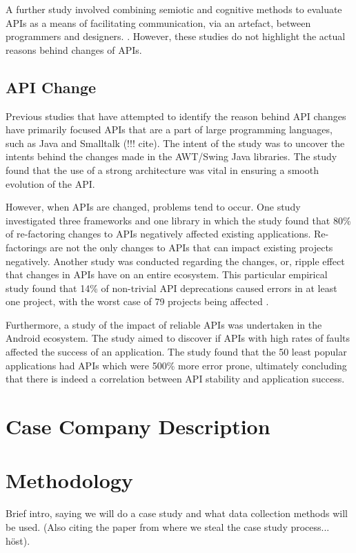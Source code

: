 \documentclass[10pt,twocolumn]{article}
\begin{document}
A further study involved combining semiotic and cognitive methods to evaluate APIs as a means of facilitating communication, via an artefact, between programmers and designers. \cite{Evaluating application programming interfaces as communication artefacts}. However, these studies do not highlight the actual reasons behind changes of APIs.

\subsection{API Change}
Previous studies that have attempted to identify the reason behind API changes have primarily focused APIs that are a part of large programming languages, such as Java and Smalltalk (!!! cite). The intent of the study was to uncover the intents behind the changes made in the AWT/Swing Java libraries. The study found that the use of a strong architecture was vital in ensuring a smooth evolution of the API.

However, when APIs are changed, problems tend to occur. One study investigated three frameworks and one library in which the study found that 80\% of re-factoring changes to APIs negatively affected existing applications. Re-factorings are not the only changes to APIs that can impact existing projects negatively. Another study was conducted regarding the changes, or, ripple effect that changes in APIs have on an entire ecosystem. This particular empirical study found that 14\% of non-trivial API deprecations caused errors in at least one project, with the worst case of 79 projects being affected \cite{!!! cite me plz}.

Furthermore, a study of the impact of reliable APIs was undertaken in the Android ecosystem. The study aimed to discover if APIs with high rates of faults affected the success of an application. The study found that the 50 least popular applications had APIs which were 500\% more error prone, ultimately concluding that there is indeed a correlation between API stability and application success. 

\section{Case Company Description}



\section{Methodology}
Brief intro, saying we will do a case study and what data collection methods will be used. (Also citing the paper from where we steal the case study process... höst).
\end{document}
